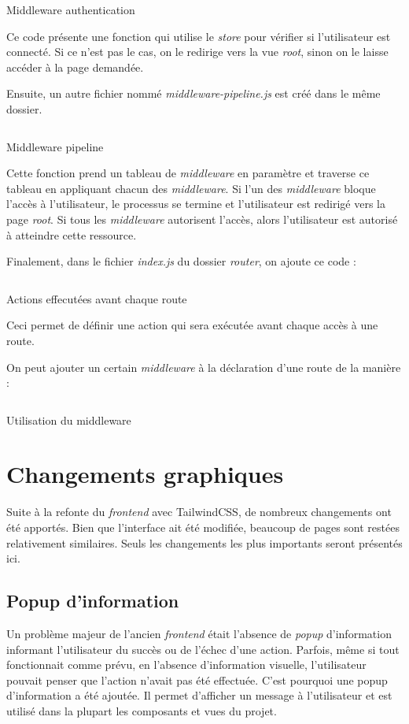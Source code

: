 \begin{listing}[H]
    \inputminted{js}{assets/code/auth.js}
    \caption{Middleware authentication}
\end{listing}
Ce code présente une fonction qui utilise le \emph{store} pour vérifier si l'utilisateur est connecté. Si ce n'est pas le cas, on le redirige vers la vue \emph{root}, sinon on le laisse accéder à la page demandée.

Ensuite, un autre fichier nommé \emph{middleware-pipeline.js} est créé dans le même dossier.
\begin{listing}[H]
    \inputminted{js}{assets/code/middlewarePipeline.js}
    \caption{Middleware pipeline}
\end{listing}

Cette fonction prend un tableau de \emph{middleware} en paramètre et traverse ce tableau en appliquant chacun des \emph{middleware}. Si l'un des \emph{middleware} bloque l'accès à l'utilisateur, le processus se termine et l'utilisateur est redirigé vers la page \emph{root}. Si tous les \emph{middleware} autorisent l'accès, alors l'utilisateur est autorisé à atteindre cette ressource.


Finalement, dans le fichier \emph{index.js} du dossier \emph{router}, on ajoute ce code :

\begin{listing}[H]
    \inputminted{js}{assets/code/beforeEachRoute.js}
    \caption{Actions effecutées avant chaque route}
\end{listing}

Ceci permet de définir une action qui sera exécutée avant chaque accès à une route.

On peut ajouter un certain \emph{middleware} à la déclaration d'une route de la manière :

\begin{listing}[H]
    \inputminted{js}{assets/code/route.js}
    \caption{Utilisation du middleware}
\end{listing}


\section{Changements graphiques}
Suite à la refonte du \emph{frontend} avec TailwindCSS, de nombreux changements ont été apportés. Bien que l'interface ait été modifiée, beaucoup de pages sont restées relativement similaires. Seuls les changements les plus importants seront présentés ici.

\subsection{Popup d'information}
Un problème majeur de l'ancien \emph{frontend} était l'absence de \emph{popup} d'information informant l'utilisateur du succès ou de l'échec d'une action. Parfois, même si tout fonctionnait comme prévu, en l'absence d'information visuelle, l'utilisateur pouvait penser que l'action n'avait pas été effectuée.
C'est pourquoi une popup d'information a été ajoutée. Il permet d'afficher un message à l'utilisateur et est utilisé dans la plupart les composants et vues du projet.

